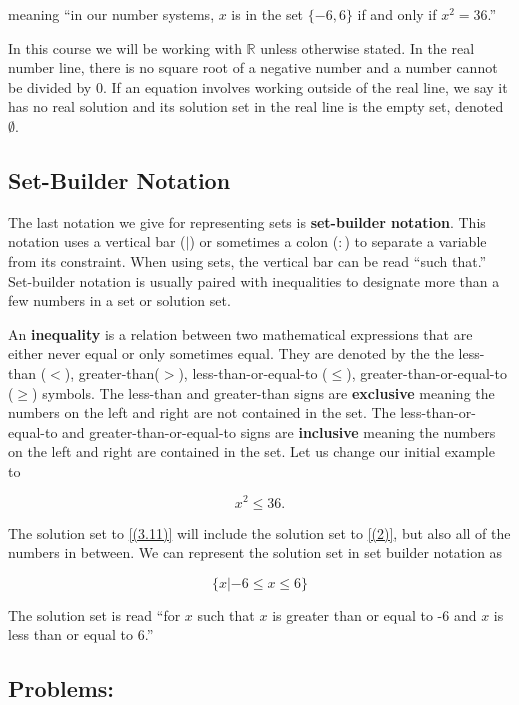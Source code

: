 \documentclass{book}
\theoremstyle{definition}
\begin{document}
meaning ``in our number systems, $x$ is in the set $\{-6,6\}$ if and only if $x^2=36$.''

In this course we will be working with $\mathbb{R}$ unless otherwise stated. In the real number line, there is no square root of a negative number and a number cannot be divided by 0. If an equation involves working outside of the real line, we say it has no real solution and its solution set in the real line is the empty set, denoted $\emptyset$.

\subsection{Set-Builder Notation}

The last notation we give for representing sets is \textbf{set-builder notation}. This notation uses a vertical bar  ($|$) or sometimes a colon ($:$) to separate a variable from its constraint. When using sets, the vertical bar can be read ``such that.'' Set-builder notation is usually paired with inequalities to designate more than a few numbers in a set or solution set.

An \textbf{inequality} is a relation between two mathematical expressions that are either never equal or only sometimes equal. They are denoted by the the less-than ($<$), greater-than($>$), less-than-or-equal-to ($\leq$), greater-than-or-equal-to ($\geq$) symbols. The less-than and greater-than signs are \textbf{exclusive} meaning the numbers on the left and right are not contained in the set. The less-than-or-equal-to and greater-than-or-equal-to signs are \textbf{inclusive} meaning the numbers on the left and right are contained in the set. Let us change our initial example to

\begin{equation}
\label{(3.11)}
x^2\leq36.
\end{equation}

The solution set to \ref{(3.11)} will include the solution set to \ref{(2)}, but also all of the numbers in between. We can represent the solution set in set builder notation as

\begin{equation}
\label{(3.12)}
\{x|-6\leq x\leq6\}
\end{equation}

The solution set is read ``for $x$ such that $x$ is greater than or equal to -6 and $x$ is less than or equal to 6.''

\subsection{Problems:}
\end{document}
